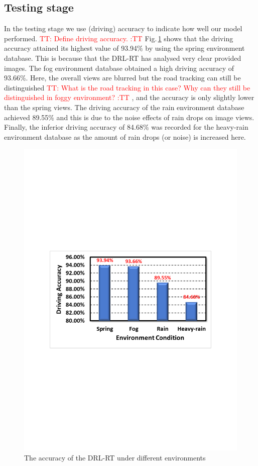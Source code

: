 \documentclass{svproc}
\renewcommand{\tt}[1]{\textcolor{red} {TT: #1 :TT} }
\begin{document}
	\subsection{Testing stage} 
	In the testing stage we use (driving) accuracy to indicate how well our model performed. \tt{Define driving accuracy.} Fig.\,\ref{fig:Main_Results} shows that the driving accuracy attained its highest value of 93.94\% by using the spring environment database. This is because that the DRL-RT has analysed very clear provided images.  The fog environment database obtained a high driving accuracy of 93.66\%. Here, the overall views are blurred but the road tracking can still be distinguished \tt{What is the road tracking in this case? Why can they still be distinguished in foggy environment?}, and the accuracy is only slightly lower than the spring views. The driving accuracy of the rain environment database achieved 89.55\% and this is due to the noise effects of rain drops on image views. Finally, the inferior driving accuracy of 84.68\% was recorded for the heavy-rain environment database as the amount of rain drops (or noise) is increased here.
	\begin{figure}[!ht]
		\centering
		\includegraphics[scale=.45,trim=3cm 10.3cm 2.7cm 10.3cm,clip]{Main_Results.pdf}
		\caption{The accuracy of the DRL-RT under different environments}
		\label{fig:Main_Results}
	\end{figure}
	
\end{document}
